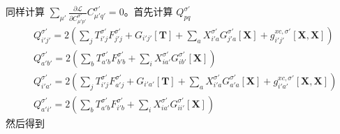 \documentclass[11pt]{ctexart}
\numberwithin{equation}{section}
\begin{document}
同样计算 $\sum_{\mu'}\frac{\partial\mathcal{L}}{\partial C_{\mu' p'}^{\sigma'}}C_{\mu'q'}^{\sigma'}=0$。首先计算 $Q_{pq}^{\sigma'}$
\begin{equation}
    \begin{aligned}
        & Q_{i'j'}^{\sigma'} = 2\left(
            \sum_{j}T_{i' j}^{\sigma'}F_{j' j}^{\sigma'}
            + G_{i' j'}[\mathbf{T}]
            + \sum_{a}X_{i' a}^{\sigma'}G_{j' a}^{\sigma'}[\mathbf{X}]
            + g_{i' j'}^{xc,\sigma'}[\mathbf{X}, \mathbf{X}]
        \right)\\
        & Q_{a'b'}^{\sigma'} = 2\left(
            \sum_{b}T_{a' b}^{\sigma'}F_{b'b}^{\sigma'}
            + \sum_{i}X_{i a'}^{\sigma'}G_{i b'}^{\sigma'}[\mathbf{X}]
        \right)\\
        & Q_{i'a'}^{\sigma'} = 2\left(
            \sum_{j}T_{i' j}^{\sigma'}F_{a' j}^{\sigma'}
            + G_{i' a'}[\mathbf{T}]
            + \sum_{a}X_{i' a}^{\sigma'}G_{a' a}^{\sigma'}[\mathbf{X}]
            + g_{i' a'}^{xc,\sigma'}[\mathbf{X}, \mathbf{X}]
        \right)\\
        & Q_{a'i'}^{\sigma'} = 2\left(
            \sum_{b}T_{a' b}^{\sigma'}F_{i' b}^{\sigma'}
            + \sum_{i}X_{i a'}^{\sigma'}G_{i i'}^{\sigma'}[\mathbf{X}]
        \right)
    \end{aligned}
\end{equation}
然后得到
\end{document}
